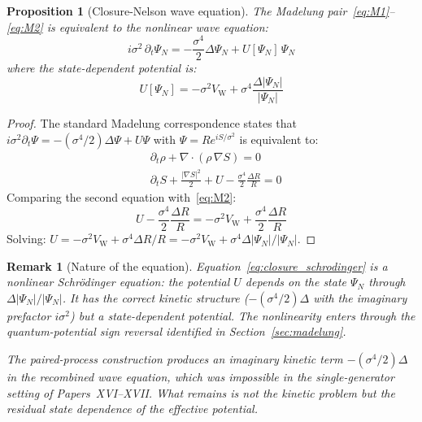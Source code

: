 \documentclass[12pt]{article}
\newtheorem{proposition}[theorem]{Proposition}
\newtheorem{remark}[theorem]{Remark}
\newcommand{\VW}{V_{\mathrm{W}}}
\begin{document}
\begin{proposition}[Closure-Nelson wave equation]\label{prop:wave}
The Madelung pair~\eqref{eq:M1}--\eqref{eq:M2} is equivalent to the nonlinear wave equation:
\begin{equation}\label{eq:closure_schrodinger}
    \boxed{i\sigma^2\,\partial_t\Psi_N = -\frac{\sigma^4}{2}\Delta\Psi_N + U[\Psi_N]\,\Psi_N}
\end{equation}
where the state-dependent potential is:
\begin{equation}\label{eq:U}
    U[\Psi_N] = -\sigma^2\VW + \sigma^4\frac{\Delta|\Psi_N|}{|\Psi_N|}
\end{equation}
\end{proposition}

\begin{proof}
The standard Madelung correspondence states that $i\sigma^2\partial_t\Psi = -(\sigma^4/2)\Delta\Psi + U\Psi$ with $\Psi = Re^{iS/\sigma^2}$ is equivalent to:
\begin{align}
    &\partial_t\rho + \nabla\cdot(\rho\,\nabla S) = 0 \\
    &\partial_t S + \frac{|\nabla S|^2}{2} + U - \frac{\sigma^4}{2}\frac{\Delta R}{R} = 0
\end{align}
Comparing the second equation with~\eqref{eq:M2}:
\begin{equation}
    U - \frac{\sigma^4}{2}\frac{\Delta R}{R} = -\sigma^2\VW + \frac{\sigma^4}{2}\frac{\Delta R}{R}
\end{equation}
Solving: $U = -\sigma^2\VW + \sigma^4\Delta R/R = -\sigma^2\VW + \sigma^4\Delta|\Psi_N|/|\Psi_N|$.
\end{proof}

\begin{remark}[Nature of the equation]
Equation~\eqref{eq:closure_schrodinger} is a \textit{nonlinear} Schr\"odinger equation: the potential $U$ depends on the state $\Psi_N$ through $\Delta|\Psi_N|/|\Psi_N|$. It has the correct kinetic structure ($-(\sigma^4/2)\Delta$ with the imaginary prefactor $i\sigma^2$) but a state-dependent potential. The nonlinearity enters through the quantum-potential sign reversal identified in Section~\ref{sec:madelung}.

The paired-process construction produces an imaginary kinetic term $-(\sigma^4/2)\Delta$ in the recombined wave equation, which was impossible in the single-generator setting of Papers~XVI--XVII. What remains is not the kinetic problem but the residual state dependence of the effective potential.
\end{remark}
\end{document}
